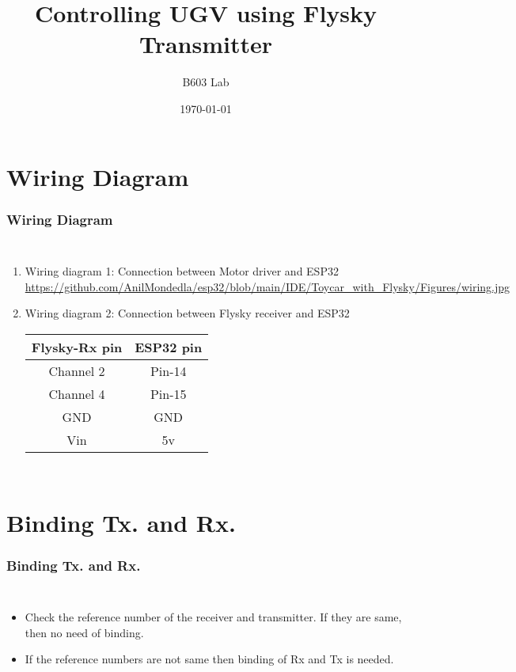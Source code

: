 \documentclass{beamer}
\title{Controlling UGV using Flysky Transmitter}
\author{B603 Lab}
\institute{Indian Institute of Technology, Hyderabad.}
\date{\today}
\begin{document}
\begin{frame}
\titlepage
\end{frame}

\section{Wiring Diagram}
\begin{frame}
\frametitle{Wiring Diagram}
\begin{columns}
  \begin{enumerate}
  \item Wiring diagram 1: Connection between Motor driver and ESP32\\
  \url{https://github.com/AnilMondedla/esp32/blob/main/IDE/Toycar_with_Flysky/Figures/wiring.jpg}
  \item Wiring diagram 2: Connection between Flysky receiver and ESP32\\
  \begin{tabular} { | c  | c  |  }
\hline
\textbf{Flysky-Rx pin} & \textbf{ESP32 pin} \\
\hline
Channel 2 & Pin-14  \\
\hline
Channel 4 & Pin-15\\
\hline
GND & GND  \\
\hline
Vin & 5v\\
\hline
\end{tabular}
  
  \end{enumerate}
  
\end{columns}

\end{frame}

\section{Binding Tx. and Rx.}
\begin{frame}
\frametitle{Binding Tx. and Rx.}
\begin{columns}

  \begin{itemize}
  \item  Check the reference number of the receiver and transmitter. If they are same, then no need of binding.
  \vspace{10pt}
  \item If the reference numbers are not same then binding of Rx and Tx is needed.
  
  
  \end{itemize}
\end{columns}



\end{frame}
\end{document}
